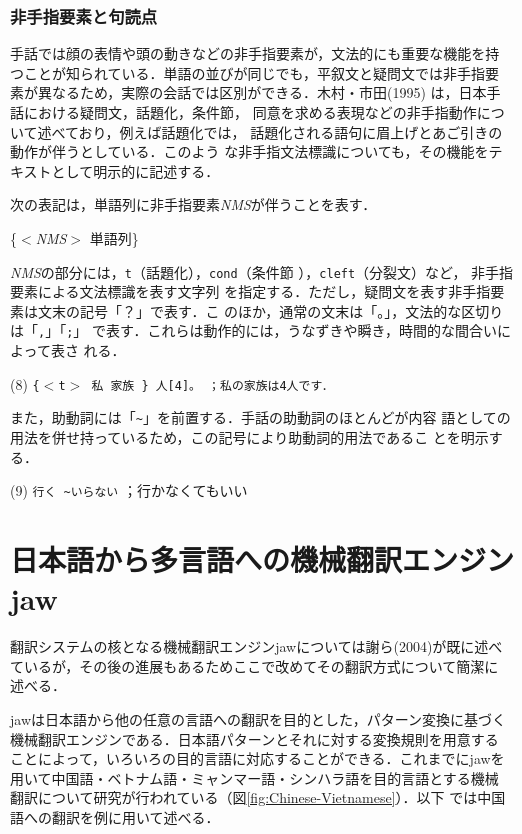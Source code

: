 \documentclass[japanese]{jnlp_1.4}
\newenvironment{ex}{}{}
\newenvironment{format}{}{}
\begin{document}
\subsubsection{非手指要素と句読点}

手話では顔の表情や頭の動きなどの非手指要素が，文法的にも重要な機能を持
つことが知られている．単語の並びが同じでも，平叙文と疑問文では非手指要
素が異なるため，実際の会話では区別ができる．木村・市田(1995)
\nocite{Kimura1995}は，日本手話における疑問文，話題化，条件節，
同意を求める表現などの非手指動作について述べており，例えば話題化では，
話題化される語句に眉上げとあご引きの動作が伴うとしている．このよう
な非手指文法標識についても，その機能をテキストとして明示的に記述する．


次の表記は，単語列に非手指要素{\it NMS}が伴うことを表す．

\begin{format}
  \textrm{\{$<${\it NMS}$>$ 単語列\}}
\end{format}

\textit{NMS}の部分には，\texttt{t}（話題化），\texttt{cond}（条件節
），\texttt{cleft}（分裂文）など，
\pagebreak
非手指要素による文法標識を表す文字列
を指定する．ただし，疑問文を表す非手指要素は文末の記号「？」で表す．こ
のほか，通常の文末は「。」，文法的な区切りは「\texttt{,}」「\texttt{;}」
で表す．これらは動作的には，うなずきや瞬き，時間的な間合いによって表さ
れる．

\begin{ex}
  (8) \>  \tt\textrm{\{}$<$t$>$ 私 家族 \textrm{\}} 人[4]。
  \> ；私の家族は4人です．
\end{ex}

また，助動詞には「\texttt{\~{}}」を前置する．手話の助動詞のほとんどが内容
語としての用法を併せ持っているため，この記号により助動詞的用法であるこ
とを明示する．

\begin{ex}
(9) \>  \texttt{行く \~{}いらない}  \> ；行かなくてもいい
\end{ex}

\section{日本語から多言語への機械翻訳エンジンjaw}

翻訳システムの核となる機械翻訳エンジンjawについては謝ら(2004)が既に述べ
ているが，その後の進展もあるためここで改めてその翻訳方式について簡潔に
述べる．


jawは日本語から他の任意の言語への翻訳を目的とした，パターン変換に基づく
機械翻訳エンジンである．日本語パターンとそれに対する変換規則を用意する
ことによって，いろいろの目的言語に対応することができる．これまでにjawを
用いて中国語・ベトナム語・ミャンマー語・シンハラ語を目的言語とする機械
翻訳について研究が行われている（図\ref{fig:Chinese-Vietnamese}）．以下
では中国語への翻訳を例に用いて述べる．
\end{document}

